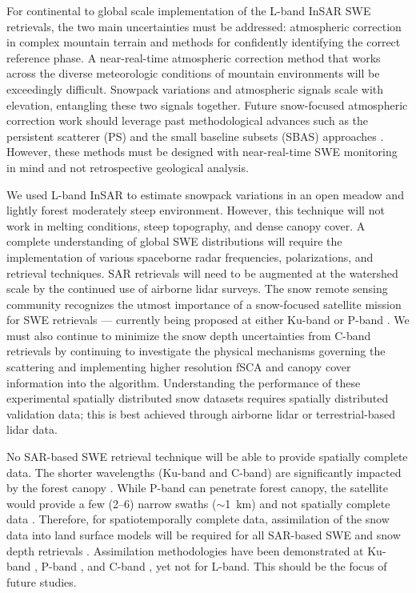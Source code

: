 For continental to global scale implementation of the L-band InSAR SWE retrievals, the two main uncertainties must be addressed: atmospheric correction in complex mountain terrain and methods for confidently identifying the correct reference phase. A near-real-time atmospheric correction method that works across the diverse meteorologic conditions of mountain environments will be exceedingly difficult. Snowpack variations and atmospheric signals scale with elevation, entangling these two signals together. Future snow-focused atmospheric correction work should leverage past methodological advances such as the persistent scatterer (PS) \citep{ferrettiPermanentScatterersSAR2001} and the small baseline subsets (SBAS) approaches \citep{berardinoNewAlgorithmSurface2002,yunjunSmallBaselineInSAR2019}. However, these methods must be designed with near-real-time SWE monitoring in mind and not retrospective geological analysis.

We used L-band InSAR to estimate snowpack variations in an open meadow and lightly forest moderately steep environment. However, this technique will not work in melting conditions, steep topography, and dense canopy cover. A complete understanding of global SWE distributions will require the implementation of various spaceborne radar frequencies, polarizations, and retrieval techniques. SAR retrievals will need to be augmented at the watershed scale by the continued use of airborne lidar surveys. The snow remote sensing community recognizes the utmost importance of a snow-focused satellite mission for SWE retrievals --- currently being proposed at either Ku-band \citep{tsangReviewArticleGlobal2022, garnaudQuantifyingSnowMass2019} or P-band \citep{shahRemoteSensingSnow2017}.  We must also continue to minimize the snow depth uncertainties from C-band retrievals \citep{lievensSnowDepthVariability2019,lievensSentinel1SnowDepth2022} by continuing to investigate the physical mechanisms governing the scattering and implementing higher resolution fSCA and canopy cover information into the algorithm. Understanding the performance of these experimental spatially distributed snow datasets requires spatially distributed validation data; this is best achieved through airborne lidar \citep{painterAirborneSnowObservatory2016} or terrestrial-based lidar data.

No SAR-based SWE retrieval technique will be able to provide spatially complete data. The shorter wavelengths (Ku-band and C-band) are significantly impacted by the forest canopy \citep{rottColdRegionsHydrology2010}. While P-band can penetrate forest canopy, the satellite would provide a few (2--6) narrow swaths ($\sim$1~km) and not spatially complete data \citep{yuehSatelliteSyntheticAperture2021}. Therefore, for spatiotemporally complete data, assimilation of the snow data into land surface models will be required for all SAR-based SWE and snow depth retrievals \citep{girottoDataAssimilationImproves2020}. Assimilation methodologies have been demonstrated at Ku-band \citep{wrzesienDevelopmentNatureRun2022, choEvaluatingUtilityActive2022}, P-band \citep{maEstimatingSpatiotemporallyContinuous2023}, and C-band \citep{girottoIdentifyingSnowfallElevation2023, brangersSentinel1SnowDepth2023}, yet not for L-band. This should be the focus of future studies.

